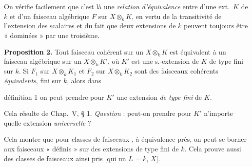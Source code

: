 \documentclass[11pt,a4paper]{article}
\begin{document}
On vérifie facilement que c'est là une \emph{relation d'équivalence}
entre   d'une ext.\ $K$ de $k$ et
d'un faisceau algébrique $F$ sur $X \otimes_k K$, en vertu 
de la transitivité de l'extension des scalaires et du fait que deux
extensions de $k$ peuvent toujours être « dominées » par une troisième.


\textbf{Proposition 2.} Tout faisceau cohérent sur un
$X \otimes_k K$ est équivalent à un faisceau algébrique sur un
$X \otimes_k K'$, où $K'$ est une s.-extension de $K$ de type fini sur
$k$. Si $F_1$ sur $X \otimes_k K_1$ et $F_2$ sur $X \otimes_k K_2$ sont
des faisceaux cohérents \emph{équivalents}, \struck{\ill{}}  \struck{\ill{}} fini sur $k$, alors dans

définition 1 on peut prendre pour $K'$ une extension \emph{de type fini}
de $K$.

Cela résulte de Chap.\ V, § 1. \emph{Question} : peut-on prendre
pour $K'$ n'importe quelle extension \emph{universelle} ?

Cela montre que pour
classes de faisceaux , \struck{\ill{}} à équivalence près, on
peut se borner aux faisceaux « définis » sur des extensions de type fini
de $k$. Cela prouve aussi 
\struck{\ill{}} des classes de faisceaux ainsi pris [qui 
un  $L$ =   \ill{}
 $k$, $X$]. 

\end{document}
